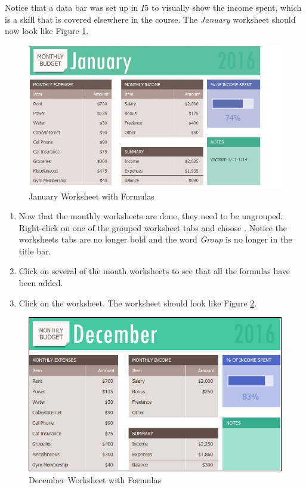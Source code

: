 Notice that a data bar was set up in $ I5 $ to visually show the income spent, which is a skill that is covered elsewhere in the course. The \textit{January} worksheet should now look like Figure \ref{06:fig05}.

\begin{figure}[H]
	\centering
	\includegraphics[width=\maxwidth{.95\linewidth}]{gfx/ch06_fig05}
	\caption{January Worksheet with Formulas}
	\label{06:fig05}
\end{figure}

\begin{enumerate}[resume]
	\item Now that the monthly worksheets are done, they need to be ungrouped. Right-click on one of the grouped worksheet tabs and choose . Notice the worksheets tabs are no longer bold and the word \textit{Group} is no longer in the title bar.
	\item Click on several of the month worksheets to see that all the formulas have been added.
	\item Click on the  worksheet. The worksheet should look like Figure \ref{06:fig06}.
\end{enumerate}

\begin{figure}[H]
	\centering
	\includegraphics[width=\maxwidth{.95\linewidth}]{gfx/ch06_fig06}
	\caption{December Worksheet with Formulas}
	\label{06:fig06}
\end{figure}

